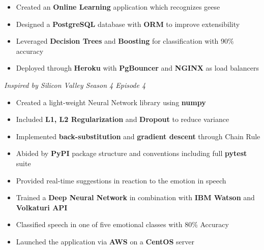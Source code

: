 \documentclass[10pt,a4paper,ragged2e]{altacv}
\begin{document}
\divider

\begin{itemize}
    \item Created an \textbf{Online Learning} application which recognizes geese
    \item Designed a \textbf{PostgreSQL} database with \textbf{ORM} to improve extensibility
    \item Leveraged \textbf{Decision Trees} and \textbf{Boosting} for classification with 90\% accuracy
    \item Deployed through \textbf{Heroku} with \textbf{PgBouncer} and \textbf{NGINX} as load balancers
\end{itemize}
\textit{Inspired by Silicon Valley Season 4 Episode 4}

\divider

\begin{itemize}
    \item Created a light-weight Neural Network library using \textbf{numpy}
    \item Included \textbf{L1, L2 Regularization} and \textbf{Dropout} to reduce variance
    \item Implemented \textbf{back-substitution} and \textbf{gradient descent} through Chain Rule
    \item Abided by \textbf{PyPI} package structure and conventions including full \textbf{pytest} suite
\end{itemize}

\divider

\begin{itemize}
   \item Provided real-time suggestions in reaction to the emotion in speech
   \item Trained a \textbf{Deep Neural Network} in combination with \textbf{IBM Watson} and \textbf{Volkaturi API}
   \item Classified speech in one of five emotional classes with 80\% Accuracy
   \item Launched the application via \textbf{AWS} on a \textbf{CentOS} server
\end{itemize}
\end{document}
